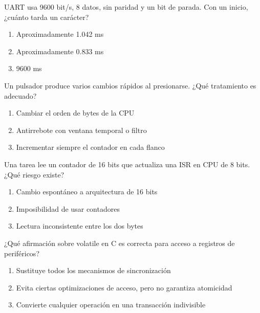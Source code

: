 \noindent\begin{minipage}{\linewidth}\setlength{\parskip}{4pt}\label{q:H-056}
UART usa 9600 bit/s, 8 datos, sin paridad y un bit de parada. Con un inicio, ¿cuánto tarda un carácter?
\begin{enumerate}[label=\Alph*),nosep]
\item Aproximadamente 1.042 ms
\item Aproximadamente 0.833 ms
\item 9600 ms
\end{enumerate}\end{minipage}\par\medskip

\noindent\begin{minipage}{\linewidth}\setlength{\parskip}{4pt}\label{q:H-057}
Un pulsador produce varios cambios rápidos al presionarse. ¿Qué tratamiento es adecuado?
\begin{enumerate}[label=\Alph*),nosep]
\item Cambiar el orden de bytes de la CPU
\item Antirrebote con ventana temporal o filtro
\item Incrementar siempre el contador en cada flanco
\end{enumerate}\end{minipage}\par\medskip

\noindent\begin{minipage}{\linewidth}\setlength{\parskip}{4pt}\label{q:H-058}
Una tarea lee un contador de 16 bits que actualiza una ISR en CPU de 8 bits. ¿Qué riesgo existe?
\begin{enumerate}[label=\Alph*),nosep]
\item Cambio espontáneo a arquitectura de 16 bits
\item Imposibilidad de usar contadores
\item Lectura inconsistente entre los dos bytes
\end{enumerate}\end{minipage}\par\medskip

\noindent\begin{minipage}{\linewidth}\setlength{\parskip}{4pt}\label{q:H-059}
¿Qué afirmación sobre volatile en C es correcta para acceso a registros de periféricos?
\begin{enumerate}[label=\Alph*),nosep]
\item Sustituye todos los mecanismos de sincronización
\item Evita ciertas optimizaciones de acceso, pero no garantiza atomicidad
\item Convierte cualquier operación en una transacción indivisible
\end{enumerate}\end{minipage}\par\medskip

